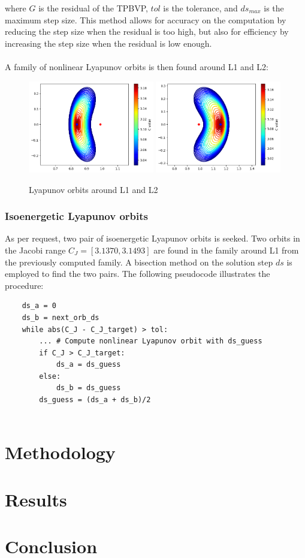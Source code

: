 \documentclass{report}
\begin{document}
where $G$ is the residual of the TPBVP, $tol$ is the tolerance, and $ds_{max}$ is the maximum step size.
This method allows for accuracy on the computation by reducing the step size when the residual is too high, but also for efficiency by increasing the step size when the residual is low enough.\\\\
\newpage
A family of nonlinear Lyapunov orbits is then found around L1 and L2:
\begin{figure}[h]
    \centering
    \includegraphics[width=0.49\textwidth]{images/L1.png}
    \includegraphics[width=0.49\textwidth]{images/L2.png}
    \caption{Lyapunov orbits around L1 and L2}
\end{figure}
\subsection*{Isoenergetic Lyapunov orbits}
As per request, two pair of isoenergetic Lyapunov orbits is seeked. Two orbits in the Jacobi range
$C_J = [3.1370, 3.1493]$ are found in the family around L1 from the previously computed family. 
A bisection method on the solution step $ds$ is employed to find the two pairs. The following pseudocode illustrates the procedure:
\begin{verbatim}
    ds_a = 0
    ds_b = next_orb_ds
    while abs(C_J - C_J_target) > tol:
        ... # Compute nonlinear Lyapunov orbit with ds_guess
        if C_J > C_J_target:
            ds_a = ds_guess
        else:
            ds_b = ds_guess
        ds_guess = (ds_a + ds_b)/2
   
\end{verbatim}




\chapter{Methodology}

\chapter{Results}

\chapter{Conclusion}
\end{document}
